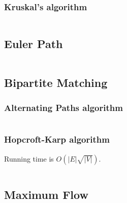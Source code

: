 \documentclass[9pt,a4paper,twocolumn,landscape,oneside]{amsart}
\newcommand{\code}[1]{\inputminted{cpp}{_code/#1}}
\newif\ifverbose
\begin{document}
        \subsubsection{Kruskal's algorithm}
            \code{graph/kruskals_mst.cpp}
    \fi

    \ifverbose
    \subsection{Topological Sort}
        \subsubsection{Modified Depth-First Search}
            \code{graph/tsort.cpp}
    \fi

    \subsection{Euler Path}
        \ifverbose
        Finds an euler path (or circuit) in a directed graph, or reports that
        none exist.
        \fi
        \code{graph/euler_path.cpp}

    \subsection{Bipartite Matching}

        \subsubsection{Alternating Paths algorithm}
            \ifverbose
            The alternating paths algorithm solves bipartite matching in $O(mn^2)$
            time, where $m$, $n$ are the number of vertices on the left and right
            side of the bipartite graph, respectively.
            \fi
            \code{graph/bipartite_matching.cpp}

        \subsubsection{Hopcroft-Karp algorithm}
            \ifverbose
            An implementation of Hopcroft-Karp algorithm for bipartite
            matching.
            \fi
            Running time is $O(|E|\sqrt{|V|})$.
            \code{graph/hopcroft_karp.cpp}

    \subsection{Maximum Flow}
\end{document}
